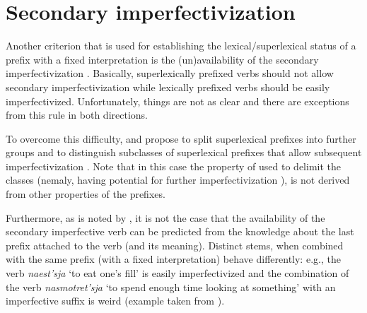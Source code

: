 \section{Secondary imperfectivization}\label{section:new:imperfectivization}
Another criterion that is used for establishing the lexical/superlexical status of a prefix with a fixed interpretation is the (un)availability of the secondary imperfectivization . Basically, superlexically prefixed verbs should not allow secondary imperfectivization  while lexically prefixed verbs should be easily imperfectivized. Unfortunately, things are not as clear and there are exceptions from this rule in both directions. 

To overcome this difficulty, \citet{Svenonius:04b} and \citet{Tatevosov:07, Tatevosov:09} propose to split superlexical prefixes  into further groups and to distinguish subclasses of superlexical prefixes  that allow subsequent imperfectivization . Note that in this case the property of used to delimit the classes (nemaly, having potential for further imperfectivization ), is not derived from other properties of the prefixes.

Furthermore, as is noted by \citet[35]{Kagan:book}, it is not the case that the availability of the secondary imperfective  verb  can be predicted from the knowledge about the last prefix attached to the verb (and its meaning). Distinct stems, when combined with the same prefix (with a fixed interpretation) behave differently: e.g., the verb \textit{naest’sja} `to eat one's fill' is easily imperfectivized and the combination of the verb \textit{nasmotret'sja} `to spend enough time looking at something' with an imperfective suffix   is weird (example taken from \citealt[35]{Kagan:book}).

